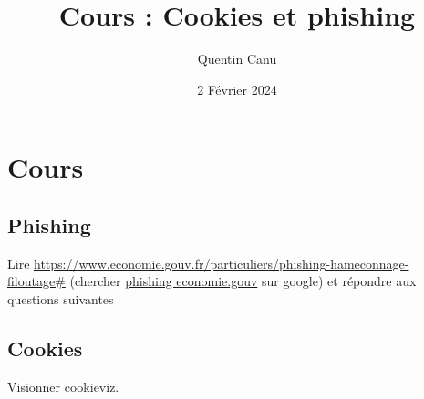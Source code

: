 \documentclass{article}
\title{Cours : Cookies et phishing}
\author{Quentin Canu}
\date{2 Février 2024}
\begin{document}
\maketitle

\section{Cours}
\subsection*{Phishing}
Lire \url{https://www.economie.gouv.fr/particuliers/phishing-hameconnage-filoutage#} (chercher \url{phishing economie.gouv} sur google) et répondre aux questions suivantes

\subsection*{Cookies}
Visionner cookieviz.
\end{document}
